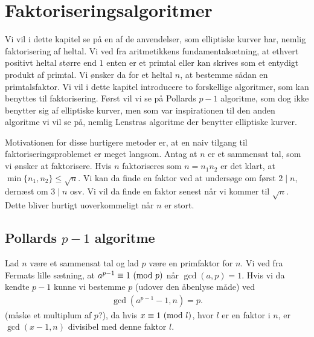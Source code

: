 \chapter{Faktoriseringsalgoritmer}
Vi vil i dette kapitel se på en af de anvendelser, som elliptiske kurver har, nemlig faktorisering af heltal. Vi ved fra aritmetikkens fundamentalsætning, at ethvert positivt heltal større end $1$ enten er et primtal eller kan skrives som et entydigt produkt af primtal. Vi ønsker da for et heltal $n$, at bestemme sådan en primtalsfaktor. Vi vil i dette kapitel introducere to forskellige algoritmer, som kan benyttes til faktorisering. Først vil vi se på Pollards $p-1$ algoritme, som dog ikke benytter sig af elliptiske kurver, men som var inspirationen til den anden algoritme vi vil se på, nemlig Lenstras algoritme der benytter elliptiske kurver.

Motivationen for disse hurtigere metoder er, at en naiv tilgang til faktoriseringsproblemet er meget langsom. Antag at $n$ er et sammensat tal, som vi 
ønsker at faktorisere. Hvis $n$ faktoriseres som $n=n_1 n_2$ er 
det klart, at $\min \{n_1, n_2 \} \leq \sqrt{n}$. Vi kan da finde
en faktor ved at undersøge om først $2 \mid n$, dernæst om 
$3 \mid n$ osv. Vi vil da finde en faktor senest når vi kommer
til $\sqrt{n}$. Dette bliver hurtigt uoverkommeligt når $n$ er stort.

\section{Pollards $p-1$ algoritme}
 
Lad $n$ være et sammensat tal og lad $p$ være en primfaktor for $n$. Vi ved fra Fermats lille sætning, at $a^{p-1} \equiv 1 \ (\mathrm{mod} \ p)$ når $\gcd(a, p) = 1$. Hvis vi da kendte $p-1$ kunne vi bestemme $p$ (udover den åbenlyse måde) ved
\begin{align*}
	\gcd(a^{p-1} - 1, n) = p. 
\end{align*}
(måske et multiplum af $p$?), da hvis $x \equiv 1 \ (\mathrm{mod} \ l)$, hvor $l$ er en faktor i $n$, er $\gcd(x-1, n)$ divisibel med denne faktor $l$.

